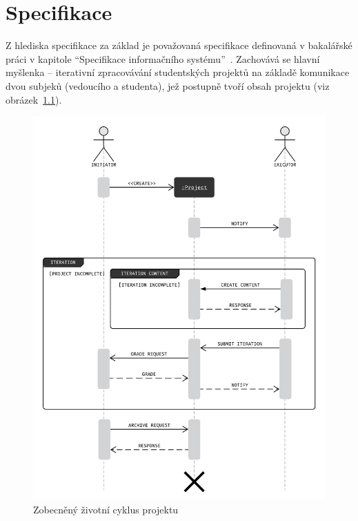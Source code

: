 \chapter{Specifikace}\label{ch:specification}

Z hlediska specifikace za základ je považovaná specifikace definovaná v bakalářské práci v kapitole \enquote{Specifikace informačního systému}~\cite{bachelorthesis}.
Zachovává se hlavní myšlenka – iterativní zpracovávání studentských projektů na základě komunikace dvou subjeků (vedoucího a studenta), jež postupně tvoří obsah projektu (viz obrázek~\ref{pic:main-communication-cycle}).

\begin{figure}[htbp]
   \centering
   \includegraphics[max width=\textwidth]{assets/dia-seq-study-project-lifecycle}
   \caption[Zobecněný životní cycklus projektu]{Zobecněný životní cyklus projektu~\cite{bachelorthesis}}\label{pic:main-communication-cycle}
\end{figure}



